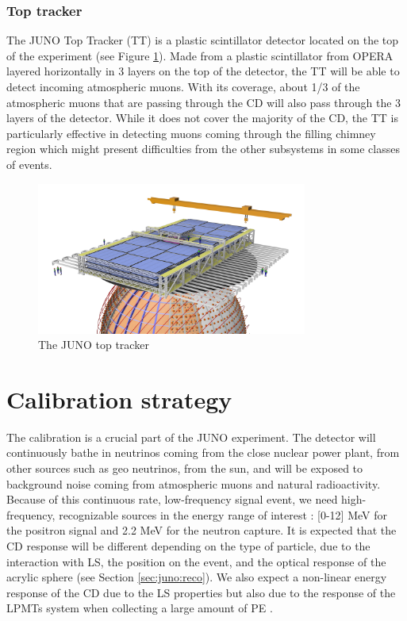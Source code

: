 \documentclass[../main.tex]{subfiles}
\begin{document}
\subsubsection{Top tracker}
The JUNO Top Tracker (TT) is a plastic scintillator detector located on the top of the experiment (see Figure \ref{fig:juno:tt}). Made from a plastic scintillator from OPERA \cite{acquafredda_opera_2009} layered horizontally in 3 layers on the top of the detector, the TT will be able to detect incoming atmospheric muons.
With its coverage, about 1/3 of the atmospheric muons that are passing through the CD will also pass through the 3 layers of the detector. While it does not cover the majority of the CD, the TT is particularly effective in detecting muons coming through the filling chimney region which might present difficulties from the other subsystems in some classes of events.
\begin{figure}[ht]
  \centering
  \includegraphics[height=5cm]{images/juno/Global_TT_01.png}
  \caption{The JUNO top tracker}
  \label{fig:juno:tt}
\end{figure}

\section{Calibration strategy}
\label{sec:juno:calib}

The calibration is a crucial part of the JUNO experiment. The detector will continuously bathe in neutrinos coming from the close nuclear power plant, from other sources such as geo neutrinos, from the sun, and will be exposed to background noise coming from atmospheric muons and natural radioactivity.
Because of this continuous rate, low-frequency signal event, we need high-frequency, recognizable sources in the energy range of interest : [0-12] MeV for the positron signal and 2.2 MeV for the neutron capture.
It is expected that the CD response will be different depending on the type of particle, due to the interaction with LS, the position on the event, and the optical response of the acrylic sphere (see Section \ref{sec:juno:reco}).
We also expect a non-linear energy response of the CD due to the LS properties \cite{bay_optimization_2020} but also due to the response of the LPMTs system when collecting a large amount of PE \cite{han_dual_2021}.
\end{document}
